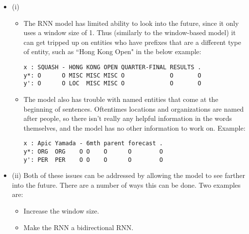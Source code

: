 \documentclass{article}
\begin{document}
\begin{itemize}
\item (i)
\begin{itemize}
\item The RNN model has limited ability to look into the future, since it only uses a window size of 1. Thus (similarly to the window-based model) it can get tripped up on entities who have prefixes that are a different type of entity, such as ``Hong Kong Open" in the below example:
\begin{verbatim}
x : SQUASH - HONG KONG OPEN QUARTER-FINAL RESULTS .
y*: O      O MISC MISC MISC O             O       O
y': O      O LOC  MISC MISC O             O       O
\end{verbatim}
\item The model also has trouble with named entities that come at the beginning of sentences. Oftentimes locations and organizations are named after people, so there isn't really any helpful information in the words themselves, and the model has no other information to work on. Example:
\begin{verbatim}
x : Apic Yamada - 6mth parent forecast .
y*: ORG  ORG    O O    O      O        O
y': PER  PER    O O    O      O        O
\end{verbatim}
\end{itemize}
\item (ii)
Both of these issues can be addressed by allowing the model to see farther into the future. There are a number of ways this can be done. Two examples are:
\begin{itemize}
\item Increase the window size.
\item Make the RNN a bidirectional RNN.
\end{itemize}
\end{itemize}
\end{document}
